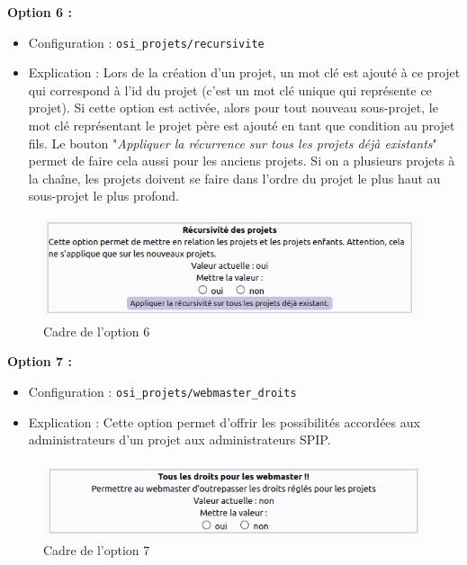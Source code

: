 \textbf{Option 6 :} 
\begin{itemize}
    \item Configuration : \texttt{osi\_projets/recursivite}
    \item Explication : Lors de la création d'un projet, un mot clé est ajouté à ce projet qui correspond à l'id du projet (c'est un mot clé unique qui représente ce projet). Si cette option est activée, alors pour tout nouveau sous-projet, le mot clé représentant le projet père est ajouté en tant que condition au projet fils. Le bouton "\textit{Appliquer la récurrence sur tous les projets déjà existants}" permet de faire cela aussi pour les anciens projets. Si on a plusieurs projets à la chaîne, les projets doivent se faire dans l'ordre du projet le plus haut au sous-projet le plus profond.
\end{itemize}
\vspace{0.5cm}
\begin{figure}[h]
    \centering
    \includegraphics[trim=0 0 0 0, clip, width=1\textwidth]{./images/c6.png}
    \caption{Cadre de l'option 6}
    \label{option6}
\end{figure}
\vspace{0.5cm}


\textbf{Option 7 :} 
\begin{itemize}
    \item Configuration : \texttt{osi\_projets/webmaster\_droits}
    \item Explication : Cette option permet d'offrir les possibilités accordées aux administrateurs d'un projet aux administrateurs SPIP.
\end{itemize}
\vspace{0.5cm}
\begin{figure}[h]
    \centering
    \includegraphics[trim=0 0 0 0, clip, width=1\textwidth]{./images/c7.png}
    \caption{Cadre de l'option 7}
    \label{option7}
\end{figure}

